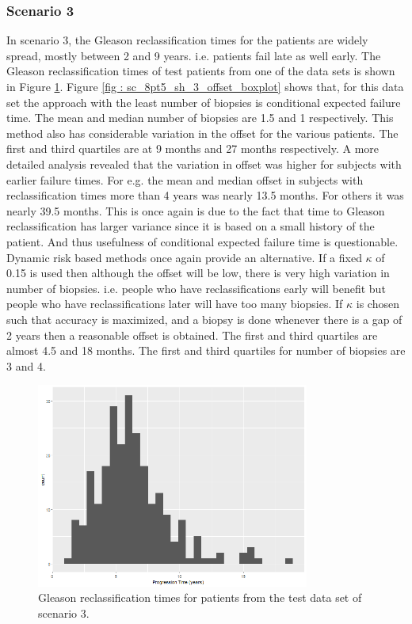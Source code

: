 \subsubsection{Scenario 3}
In scenario 3, the Gleason reclassification times for the patients are widely spread, mostly between 2 and 9 years. i.e. patients fail late as well early. The Gleason reclassification times of test patients from one of the data sets is shown in Figure \ref{fig : sc_8pt5_sh_3_progression_hist}. Figure \ref{fig : sc_8pt5_sh_3_offset_boxplot} shows that, for this data set the approach with the least number of biopsies is conditional expected failure time. The mean and median number of biopsies are 1.5 and 1 respectively. This method also has considerable variation in the offset for the various patients. The first and third quartiles are at 9 months and 27 months respectively. A more detailed analysis revealed that the variation in offset was higher for subjects with earlier failure times. For e.g. the mean and median offset in subjects with reclassification times more than 4 years was nearly 13.5 months. For others it was nearly 39.5 months. This is once again is due to the fact that time to Gleason reclassification has larger variance since it is based on a small history of the patient. And thus usefulness of conditional expected failure time is questionable.\\

Dynamic risk based methods once again provide an alternative. If a fixed $\kappa$ of 0.15 is used then although the offset will be low, there is very high variation in number of biopsies. i.e. people who have reclassifications early will benefit but people who have reclassifications later will have too many biopsies. If $\kappa$ is chosen such that accuracy is maximized, and a biopsy is done whenever there is a gap of 2 years then a reasonable offset is obtained. The first and third quartiles are almost 4.5 and 18 months. The first and third quartiles for number of biopsies are 3 and 4. 

\begin{figure}[H]
\centering
\captionsetup{justification=centering}
\includegraphics[width=0.8\textwidth]{sim_study_res_sc_8pt5_sh_3/progression_hist.png}
\caption{\label{fig : sc_8pt5_sh_3_progression_hist} Gleason reclassification times for patients from the test data set of scenario 3.}
\end{figure}

